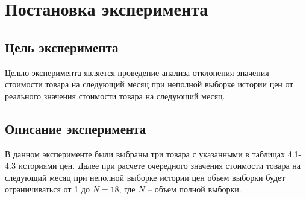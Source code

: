 \documentclass{bmstu}
\begin{document}
\section{Постановка эксперимента}

\subsection{Цель эксперимента}

Целью эксперимента является проведение анализа отклонения значения стоимости товара на следующий месяц при неполной выборке истории цен от реального значения стоимости товара на следующий месяц.

\subsection{Описание эксперимента}

В данном эксперименте были выбраны три товара с указанными в таблицах 4.1-4.3 историями цен. Далее при расчете очередного значения стоимости товара на следующий месяц при неполной выборке истории цен объем выборки будет ограничиваться от 1 до $N = 18$, где $N$ -- объем полной выборки.
	
\end{document}
